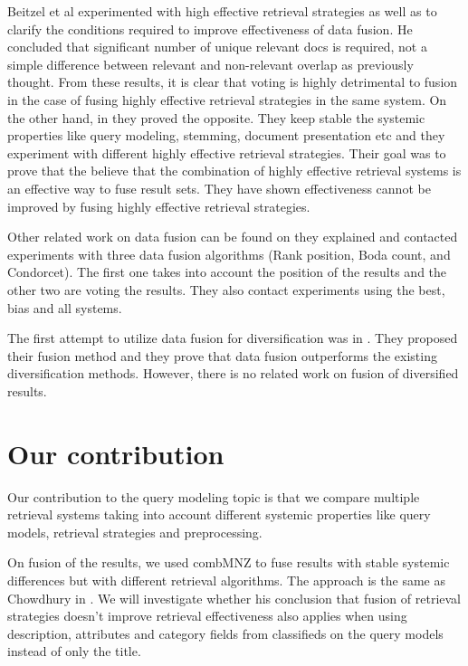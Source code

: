 Beitzel et al \cite{Beitzel} experimented with high effective retrieval strategies as well as to clarify the conditions required to improve effectiveness of data fusion. He concluded that significant number of unique relevant docs is required, not a simple difference between relevant and non-relevant overlap as previously thought. From these results, it is clear that voting is highly detrimental to fusion in the case of fusing highly effective retrieval strategies in the same system. On the other hand, in \cite{Beitzel04} they proved the opposite. They keep stable the systemic properties like query modeling, stemming, document presentation etc and they experiment with different highly effective retrieval strategies. Their goal was to prove that the believe that the combination of highly effective retrieval systems is an effective way to fuse result sets. They have shown effectiveness cannot be improved by fusing highly effective retrieval strategies.

Other related work on data fusion can be found on \cite{NurayCan} they explained and contacted experiments with three data fusion algorithms (Rank position, Boda count, and Condorcet). The first one takes into account the position of the results and the other two are voting the results. They also contact experiments using the best, bias and all systems.

The first attempt to utilize data fusion for diversification was in \cite{LiangRenMaarten}. They proposed their fusion method and they prove that data fusion outperforms the existing diversification methods. However, there is no related work on fusion of diversified results.

\section{Our contribution}
Our contribution to the query modeling topic is that we compare multiple retrieval systems taking into account different systemic properties like query models, retrieval strategies and preprocessing.

On fusion of the results, we used combMNZ to fuse results with stable systemic differences but with different retrieval algorithms. The approach is the same as Chowdhury in \cite{Chowdhury}. We will investigate whether his conclusion that fusion of retrieval strategies doesn't improve retrieval effectiveness also applies when using description, attributes and category fields from classifieds on the query models instead of only the title.

